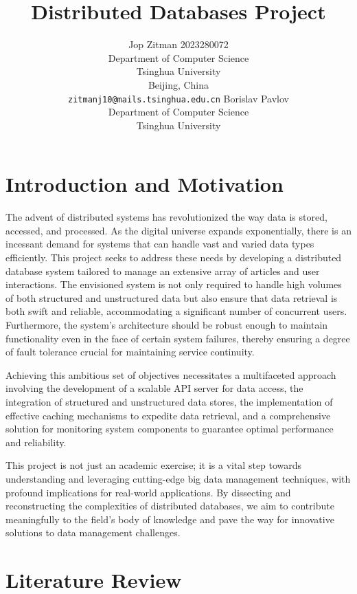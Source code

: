 \documentclass{article}
\title{Distributed Databases Project}
\author{
    Jop Zitman 2023280072\\
    Department of Computer Science\\
    Tsinghua University\\
    Beijing, China \\
    \texttt{zitmanj10@mails.tsinghua.edu.cn}
    \And
    Borislav Pavlov\\
    Department of Computer Science\\
    Tsinghua University\\
    \texttt{}
}
\begin{document}
    \maketitle

    \begin{abstract}
    \end{abstract}


    \section{Introduction and Motivation}
    The advent of distributed systems has revolutionized the way data is stored, accessed, and processed. As the digital universe expands exponentially, there is an incessant demand for systems that can handle vast and varied data types efficiently. This project seeks to address these needs by developing a distributed database system tailored to manage an extensive array of articles and user interactions. The envisioned system is not only required to handle high volumes of both structured and unstructured data but also ensure that data retrieval is both swift and reliable, accommodating a significant number of concurrent users. Furthermore, the system's architecture should be robust enough to maintain functionality even in the face of certain system failures, thereby ensuring a degree of fault tolerance crucial for maintaining service continuity.

    Achieving this ambitious set of objectives necessitates a multifaceted approach involving the development of a scalable API server for data access, the integration of structured and unstructured data stores, the implementation of effective caching mechanisms to expedite data retrieval, and a comprehensive solution for monitoring system components to guarantee optimal performance and reliability.

    This project is not just an academic exercise; it is a vital step towards understanding and leveraging cutting-edge big data management techniques, with profound implications for real-world applications. By dissecting and reconstructing the complexities of distributed databases, we aim to contribute meaningfully to the field's body of knowledge and pave the way for innovative solutions to data management challenges.


    \section{Literature Review}
\end{document}
